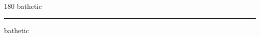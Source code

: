 
\begin{frame}
\begin{center}
\begin{turn}{180}
{\fontsize{2.5cm}{1em}\selectfont bathetic}
\end{turn}
\vspace{1em}\par  
\hrule
\vspace{1em}\par  
{\fontsize{2.5cm}{1em}\selectfont bathetic}
\end{center}
\end{frame}
